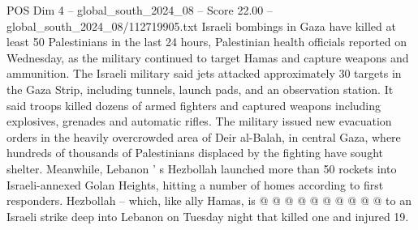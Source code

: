 \begin{textsample}{POS Dim 4 – global\_south\_2024\_08 – Score 22.00 – global\_south\_2024\_08/112719905.txt}
Israeli bombings in Gaza have killed at least 50 Palestinians in the last 24 hours, Palestinian health officials reported on Wednesday, as the military continued to target Hamas and capture weapons and ammunition.
The Israeli military said jets attacked approximately 30 targets in the Gaza Strip, including tunnels, launch pads, and an observation station.
It said troops killed dozens of armed fighters and captured weapons including explosives, grenades and automatic rifles.
The military issued new evacuation orders in the heavily overcrowded area of Deir al-Balah, in central Gaza, where hundreds of thousands of Palestinians displaced by the fighting have sought shelter.
Meanwhile, Lebanon ' s Hezbollah launched more than 50 rockets into Israeli-annexed Golan Heights, hitting a number of homes according to first responders.
Hezbollah -- which, like ally Hamas, is @ @ @ @ @ @ @ @ @ @ to an Israeli strike deep into Lebanon on Tuesday night that killed one and injured 19.

\end{textsample}
